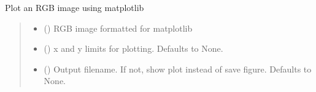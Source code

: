 \documentclass[letterpaper,10pt,english]{sphinxmanual}
\begin{document}

\begin{fulllineitems}
\label{\detokenize{modules:cubespa.plotting.util_plots.plot_bbox}}
\pysigstartsignatures
{}
\pysigstopsignatures
\end{fulllineitems}


\begin{fulllineitems}
\label{\detokenize{modules:cubespa.plotting.util_plots.plot_rgb}}
\pysigstartsignatures
{}
\pysigstopsignatures
\sphinxAtStartPar
Plot an RGB image using matplotlib
\begin{quote}\begin{description}
\begin{itemize}
\item {} 
\sphinxAtStartPar
{} () \textendash{} RGB image formatted for matplotlib

\item {} 
\sphinxAtStartPar
{} (\sphinxstyleliteralemphasis{\sphinxupquote{, }}) \textendash{} x and y limits for plotting. Defaults to None.

\item {} 
\sphinxAtStartPar
{} (\sphinxstyleliteralemphasis{\sphinxupquote{, }}) \textendash{} Output filename. If not, show plot instead of
save figure. Defaults to None.

\end{itemize}

\end{description}\end{quote}

\end{fulllineitems}
\end{document}
